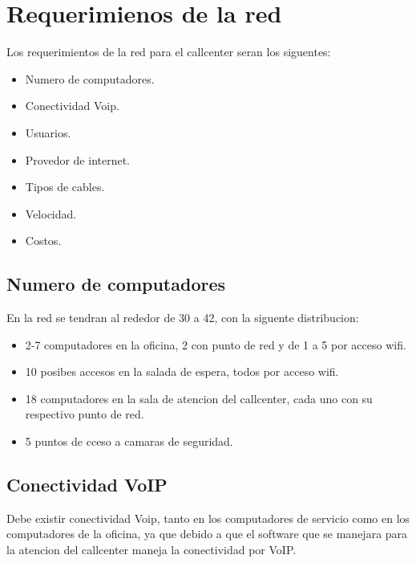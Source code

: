 \documentclass[12pt]{article}
\begin{document}
\pagebreak
\section{\textbf{Requerimienos de la red}}
Los requerimientos de la red para el callcenter seran los siguentes:
\begin{itemize}
\item
Numero de computadores.
\item
Conectividad Voip.
\item
Usuarios.
\item
Provedor de internet.
\item
Tipos de cables.
\item
Velocidad.
\item
Costos.
\end{itemize}

\subsection{\textbf{Numero de computadores}}
En la red se tendran al rededor de 30 a 42, con la siguente distribucion:
\begin{itemize}
\item
2-7 computadores en la oficina, 2 con punto de red y de 1 a 5 por acceso wifi.
\item
10 posibes accesos en la salada de espera, todos por acceso wifi.
\item
18 computadores en la sala de atencion del callcenter, cada uno con su respectivo punto de red.
\item
5 puntos de cceso a camaras de seguridad.
\end{itemize}

\subsection{\textbf{Conectividad VoIP}}
Debe existir conectividad Voip, tanto en los computadores de servicio como en los computadores de la oficina, ya que debido a que el software que se manejara para la atencion del callcenter maneja la conectividad por VoIP.

\end{document}
